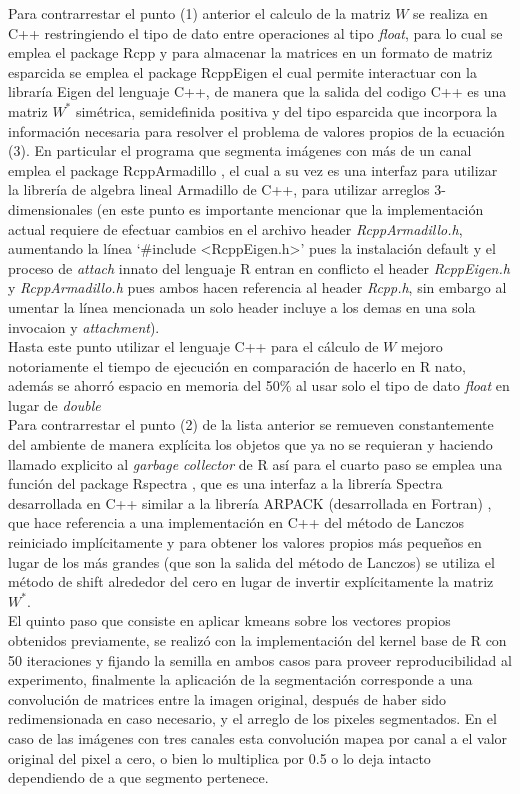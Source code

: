 \documentclass[conference]{IEEEtran}
\begin{document}
Para contrarrestar el punto (1) anterior el calculo de la matriz $W$ se realiza en C++ restringiendo el tipo de dato entre operaciones al tipo \textit{float}, para lo cual se emplea el package Rcpp \cite{Rcpp} y para almacenar la matrices en un formato de matriz esparcida se emplea el package RcppEigen \cite{RcppEigen} el cual permite interactuar con la libraría Eigen del lenguaje C++, de manera que la salida del codigo C++ es una matriz $W^*$ simétrica, semidefinida positiva y del tipo esparcida que incorpora la información necesaria para resolver el problema de valores propios de la ecuación (3). En particular el programa que segmenta imágenes con más de un canal emplea el package RcppArmadillo \cite{RcppArmadillo}, el cual a su vez es una interfaz para utilizar la librería de algebra lineal Armadillo de C++, para utilizar arreglos 3-dimensionales (en este punto es importante mencionar que la implementación actual requiere de efectuar cambios en el archivo header \textit{RcppArmadillo.h}, aumentando la línea ‘\#include <RcppEigen.h>’ pues la instalación default y el proceso de \textit{attach} innato del lenguaje R entran en conflicto el header \textit{RcppEigen.h} y \textit{RcppArmadillo.h} pues ambos hacen referencia al header \textit{Rcpp.h}, sin embargo al umentar la línea mencionada un solo header incluye a los demas en una sola invocaion y \textit{attachment}).\\ 
Hasta este punto utilizar el lenguaje C++ para el cálculo de $W$ mejoro notoriamente el tiempo de ejecución en comparación de hacerlo en R nato, además se ahorró espacio en memoria del 50\% al usar solo el tipo de dato \textit{float} en lugar de \textit{double} \\
Para contrarrestar el punto (2) de la lista anterior se remueven constantemente del ambiente de manera explícita los objetos que ya no se requieran y haciendo llamado explicito al \textit{garbage collector} de R así para el cuarto paso se emplea una función del package Rspectra \cite{RSpectra}, que es una interfaz a la librería Spectra desarrollada en C++ similar a la librería ARPACK (desarrollada en Fortran) , que hace referencia a una implementación en C++ del método de Lanczos reiniciado implícitamente y para obtener los valores propios más pequeños en lugar de los más grandes (que son la salida del método de Lanczos) se utiliza el método de shift alrededor del cero en lugar de invertir explícitamente la matriz $W^*$.\\
El quinto paso que consiste en aplicar kmeans sobre los vectores propios obtenidos previamente, se realizó con la implementación del kernel base de R con 50 iteraciones y fijando la semilla en ambos casos para proveer reproducibilidad al experimento, finalmente la aplicación de la segmentación corresponde a una convolución de matrices entre la imagen original, después de haber sido redimensionada en caso necesario, y el arreglo de los pixeles segmentados. En el caso de las imágenes con tres canales esta convolución mapea por canal a el valor original del pixel a cero, o bien lo multiplica por 0.5 o lo deja intacto dependiendo de a que segmento pertenece. 
\end{document}
